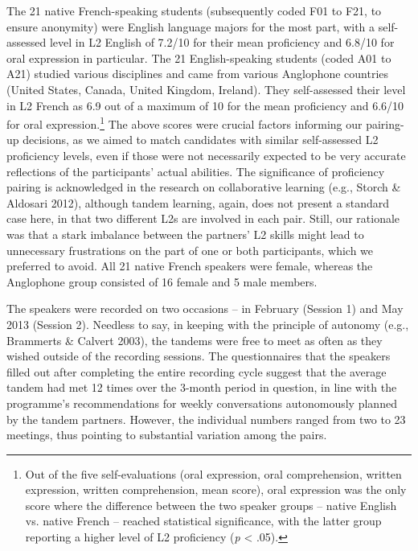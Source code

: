 \documentclass[12pt]{article}
\newenvironment{styleStandard}{\setlength\leftskip{0cm}\setlength\rightskip{0cm plus 1fil}\setlength\parindent{0cm}\setlength\parfillskip{0pt plus 1fil}\setlength\parskip{0cm plus 1pt}\writerlistparindent\writerlistleftskip\leavevmode\normalfont\normalsize\writerlistlabel\ignorespaces}{\unskip\vspace{0cm plus 1pt}\par}
\newcommand\writerlistleftskip{}
\newcommand\writerlistparindent{}
\newcommand\writerlistlabel{}
\begin{document}
\begin{styleStandard}
The 21 native French-speaking students (subsequently coded F01 to F21, to ensure anonymity) were English language majors for the most part, with a self-assessed level in L2 English of 7.2/10 for their mean proficiency and 6.8/10 for oral expression in particular. The 21 English-speaking students (coded A01 to A21) studied various disciplines and came from various Anglophone countries (United States, Canada, United Kingdom, Ireland). They self-assessed their level in L2 French as 6.9 out of a maximum of 10 for the mean proficiency and 6.6/10 for oral expression.\footnote{ Out of the five self-evaluations (oral expression, oral comprehension, written expression, written comprehension, mean score), oral expression was the only score where the difference between the two speaker groups – native English vs. native French – reached statistical significance, with the latter group reporting a higher level of L2 proficiency (\textit{p} {\textless} .05).} The above scores were crucial factors informing our pairing-up decisions, as we aimed to match candidates with similar self-assessed L2 proficiency levels, even if those were not necessarily expected to be very accurate reflections of the participants’ actual abilities. The significance of proficiency pairing is acknowledged in the research on collaborative learning (e.g., Storch \& Aldosari 2012), although tandem learning, again, does not present a standard case here, in that two different L2s are involved in each pair. Still, our rationale was that a stark imbalance between the partners’ L2 skills might lead to unnecessary frustrations on the part of one or both participants, which we preferred to avoid. All 21 native French speakers were female, whereas the Anglophone group consisted of 16 female and 5 male members.
\end{styleStandard}

\begin{styleStandard}
The speakers were recorded on two occasions – in February (Session 1) and May 2013 (Session 2). Needless to say, in keeping with the principle of autonomy (e.g., Brammerts \& Calvert 2003), the tandems were free to meet as often as they wished outside of the recording sessions. The questionnaires that the speakers filled out after completing the entire recording cycle suggest that the average tandem had met 12 times over the 3-month period in question, in line with the programme’s recommendations for weekly conversations autonomously planned by the tandem partners. However, the individual numbers ranged from two to 23 meetings, thus pointing to substantial variation among the pairs. 
\end{styleStandard}
\end{document}
